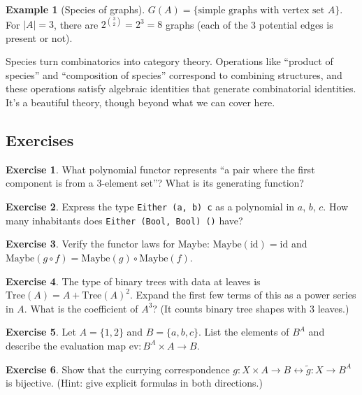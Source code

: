 \documentclass[11pt]{article}
\newcommand{\id}{\mathrm{id}}
\theoremstyle{definition}
\newtheorem{example}{Example}[section]
\newtheorem{exercise}{Exercise}[section]
\theoremstyle{plain}
\theoremstyle{remark}
\begin{document}
\begin{example}[Species of graphs]
$G(A) = \{\text{simple graphs with vertex set } A\}$. For $|A| = 3$, there are $2^{\binom{3}{2}} = 2^3 = 8$ graphs (each of the 3 potential edges is present or not).
\end{example}

Species turn combinatorics into category theory. Operations like ``product of species'' and ``composition of species'' correspond to combining structures, and these operations satisfy algebraic identities that generate combinatorial identities. It's a beautiful theory, though beyond what we can cover here.

\subsection{Exercises}

\begin{exercise}
What polynomial functor represents ``a pair where the first component is from a 3-element set''? What is its generating function?
\end{exercise}

\begin{exercise}
Express the type \texttt{Either (a, b) c} as a polynomial in $a$, $b$, $c$. How many inhabitants does \texttt{Either (Bool, Bool) ()} have?
\end{exercise}

\begin{exercise}
Verify the functor laws for Maybe: $\text{Maybe}(\id) = \id$ and $\text{Maybe}(g \circ f) = \text{Maybe}(g) \circ \text{Maybe}(f)$.
\end{exercise}

\begin{exercise}
The type of binary trees with data at leaves is $\text{Tree}(A) = A + \text{Tree}(A)^2$. Expand the first few terms of this as a power series in $A$. What is the coefficient of $A^3$? (It counts binary tree shapes with 3 leaves.)
\end{exercise}

\begin{exercise}
Let $A = \{1, 2\}$ and $B = \{a, b, c\}$. List the elements of $B^A$ and describe the evaluation map $\mathrm{ev}: B^A \times A \to B$.
\end{exercise}

\begin{exercise}
Show that the currying correspondence $g: X \times A \to B \leftrightarrow \tilde{g}: X \to B^A$ is bijective. (Hint: give explicit formulas in both directions.)
\end{exercise}
\end{document}
